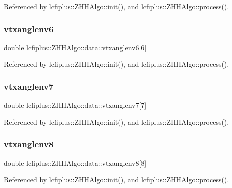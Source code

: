 Referenced by lcfiplus\+::\+Z\+H\+H\+Algo\+::init(), and lcfiplus\+::\+Z\+H\+H\+Algo\+::process().

\mbox{\label{structlcfiplus_1_1ZHHAlgo_1_1data_af20775a562777e6b28e878145e5d946b}} 
\subsubsection{vtxanglenv6}
{\footnotesize\ttfamily double lcfiplus\+::\+Z\+H\+H\+Algo\+::data\+::vtxanglenv6[6]}



Referenced by lcfiplus\+::\+Z\+H\+H\+Algo\+::init(), and lcfiplus\+::\+Z\+H\+H\+Algo\+::process().

\mbox{\label{structlcfiplus_1_1ZHHAlgo_1_1data_a92ecb85c29a185317bb656efc9b57b62}} 
\subsubsection{vtxanglenv7}
{\footnotesize\ttfamily double lcfiplus\+::\+Z\+H\+H\+Algo\+::data\+::vtxanglenv7[7]}



Referenced by lcfiplus\+::\+Z\+H\+H\+Algo\+::init(), and lcfiplus\+::\+Z\+H\+H\+Algo\+::process().

\mbox{\label{structlcfiplus_1_1ZHHAlgo_1_1data_af6fcc97ed7dce4845fc1e126654b2af3}} 
\subsubsection{vtxanglenv8}
{\footnotesize\ttfamily double lcfiplus\+::\+Z\+H\+H\+Algo\+::data\+::vtxanglenv8[8]}



Referenced by lcfiplus\+::\+Z\+H\+H\+Algo\+::init(), and lcfiplus\+::\+Z\+H\+H\+Algo\+::process().

\mbox{\label{structlcfiplus_1_1ZHHAlgo_1_1data_ac3334eccf9ac3625a48b9c0919bb465b}} 
